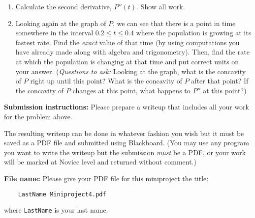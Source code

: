 \documentclass[11pt,letterpaper]{article}
\begin{document}
\begin{enumerate}
	\item Calculate the second derivative, $P''(t)$. Show all work. 

	\item Looking again at the graph of $P$, we can see that there is a point in time somewhere in the interval $0.2 \leq t \leq 0.4$ where the population is growing at its fastest rate. Find the \emph{exact} value of that time (by using computations you have already made along with algebra and trigonometry). Then, find the rate at which the population is changing at that time and put correct units on your answer. (\emph{Questions to ask:} Looking at the graph, what is the concavity of $P$ right up until this point? What is the concavity of $P$ after that point? If the concavity of $P$ changes at this point, what happens to $P''$ at this point?)

\end{enumerate}



\hrulefill

\noindent
\textbf{Submission instructions:} Please prepare a writeup that includes all your work for the problem above. 

The resulting writeup can be done in whatever fashion you wish but it must be saved as a PDF file and submitted using Blackboard. (You may use any program you want to write the writeup but the submission \emph{must} be a PDF, or your work will be marked at Novice level and returned without comment.) 

\noindent
\textbf{File name:} Please give your PDF file for this miniproject the title: 
\begin{verbatim}
	LastName Miniproject4.pdf
\end{verbatim}
where \texttt{LastName} is your last name. 
\end{document}
